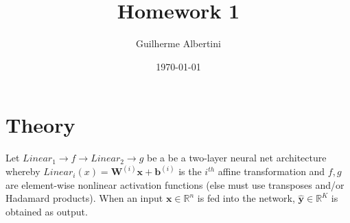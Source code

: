 \documentclass{article}
\title{Homework 1}
\author{Guilherme Albertini}
\date\today
\begin{document}
\maketitle %

\section*{Theory}
Let $Linear_1 \rightarrow f \rightarrow  Linear_2 \rightarrow g $ be a be a
two-layer neural net architecture whereby $Linear_i(x) =
  \bm{W}^{(i)}\bm{x}+\bm{b}^{(i)}$ is the $i^{th}$ affine transformation and
$f,
  g$ are element-wise nonlinear activation functions (else must use transposes and/or Hadamard products). When an input $\bm{x}\in
  \mathbb{R}^n$ is fed into the network, $\bm{\hat{y}} \in \mathbb{R}^K$ is
obtained as output.
\end{document}
